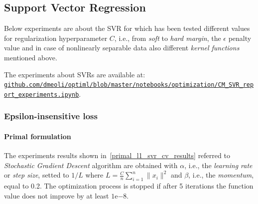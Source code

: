 \pagebreak

\subsection{Support Vector Regression}

Below experiments are about the SVR for which has been tested different values for regularization hyperparameter $C$, i.e., from \emph{soft} to \emph{hard margin}, the $\epsilon$ penalty value and in case of nonlinearly separable data also different \emph{kernel functions} mentioned above.

The experiments about SVRs are available at: \\ \href{https://github.com/dmeoli/optiml/blob/master/notebooks/optimization/CM_SVR_report_experiments.ipynb}{\texttt{github.com/dmeoli/optiml/blob/master/notebooks/optimization/CM\_SVR\_report\_experiments.ipynb}}.

\subsubsection{Epsilon-insensitive loss}

\paragraph{Primal formulation}


The experiments results shown in~\ref{primal_l1_svr_cv_results} referred to \emph{Stochastic Gradient Descent} algorithm are obtained with $\alpha$, i.e., the \emph{learning rate} or \emph{step size}, setted to $1/L$ where $\displaystyle L = \frac{C}{n} \sum_{i=1}^n \| x_i \|^2$ and $\beta$, i.e., the \emph{momentum}, equal to 0.2. The optimization process is stopped if after 5 iterations the function value does not improve by at least $1\mathrm{e}{-8}$.



